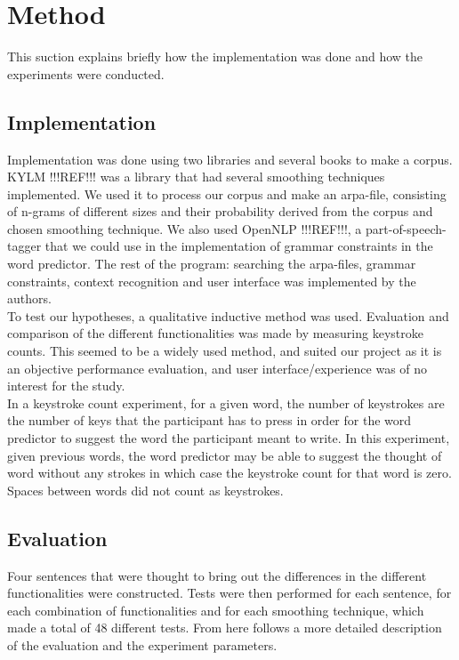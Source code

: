 \section{Method}
This suction explains briefly how the implementation was done and how the experiments were conducted.
\subsection{Implementation}
Implementation was done using two libraries and several books to make a corpus. KYLM !!!REF!!! was a library that had several smoothing techniques implemented. We used it to process our corpus and make an arpa-file, consisting of n-grams of different sizes and their probability derived from the corpus and chosen smoothing technique. We also used OpenNLP !!!REF!!!, a part-of-speech-tagger that we could use in the implementation of grammar constraints in the word predictor. The rest of the program: searching the arpa-files, grammar constraints, context recognition and user interface was implemented by the authors.\\

To test our hypotheses, a qualitative inductive method was used. Evaluation and comparison of the different functionalities was made by measuring keystroke counts. This seemed to be a widely used method, and suited our project as it is an objective performance evaluation, and user interface/experience was of no interest for the study.\\

In a keystroke count experiment, for a given word, the number of keystrokes are the number of keys that the participant has to press in order for the word predictor to suggest the word the participant meant to write. In this experiment, given previous words, the word predictor may be able to suggest the thought of word without any strokes in which case the keystroke count for that word is zero. Spaces between words did not count as keystrokes.

\subsection{Evaluation}
Four sentences that were thought to bring out the differences in the different functionalities were constructed. Tests were then performed for each sentence, for each combination of functionalities and for each smoothing technique, which made a total of 48 different tests. From here follows a more detailed description of the evaluation and the experiment parameters.